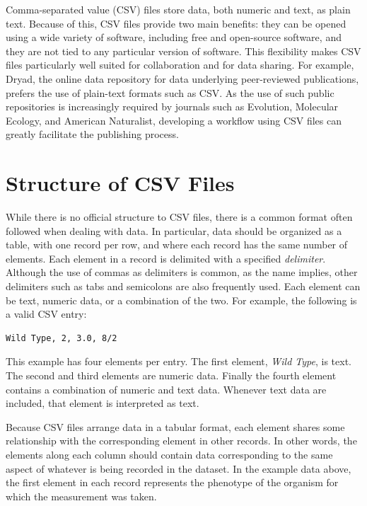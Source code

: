 Comma-separated value (CSV) files store data, both numeric and text, as
plain text. Because of this, CSV files provide two main benefits: they
can be opened using a wide variety of software, including free and
open-source software, and they are not tied to any particular version of
software. This flexibility makes CSV files particularly well suited for
collaboration and for data sharing. For example, Dryad, the online data
repository for data underlying peer-reviewed publications, prefers the
use of plain-text formats such as CSV. As the use of such public
repositories is increasingly required by journals such as Evolution,
Molecular Ecology, and American Naturalist, developing a workflow using
CSV files can greatly facilitate the publishing process.

\section{Structure of CSV Files}

While there is no official structure to CSV files, there is a common
format often followed when dealing with data. In particular, data should
be organized as a table, with one record per row, and where each record
has the same number of elements. Each element in a record is delimited
with a specified \emph{delimiter}. Although the use of commas as
delimiters is common, as the name implies, other delimiters such as tabs
and semicolons are also frequently used. Each element can be text,
numeric data, or a combination of the two. For example, the following is
a valid CSV entry:

\begin{lstlisting}
Wild Type, 2, 3.0, 8/2
\end{lstlisting}

This example has four elements per entry. The first element, \emph{Wild
Type}, is text. The second and third elements are numeric data. Finally
the fourth element contains a combination of numeric and text data.
Whenever text data are included, that element is interpreted as text.

Because CSV files arrange data in a tabular format, each element shares
some relationship with the corresponding element in other records. In
other words, the elements along each column should contain data
corresponding to the same aspect of whatever is being recorded in the
dataset. In the example data above, the first element in each record
represents the phenotype of the organism for which the measurement was
taken.


